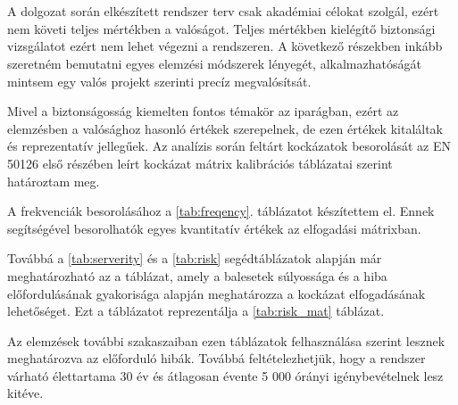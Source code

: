 \chapter{\analysis}\label{chap:analysis}
A dolgozat során elkészített rendszer terv csak akadémiai célokat szolgál, ezért nem követi teljes mértékben a valóságot.
Teljes mértékben kielégítő biztonsági vizsgálatot ezért nem lehet végezni a rendszeren.
A következő részekben inkább szeretném bemutatni egyes elemzési módszerek lényegét, alkalmazhatóságát mintsem egy valós projekt szerinti precíz megvalósítsát.

Mivel a biztonságosság kiemelten fontos témakör az iparágban, ezért az elemzésben a valósághoz hasonló értékek szerepelnek, de ezen értékek kitaláltak és reprezentatív jellegűek.
Az analízis során feltárt kockázatok besorolását az EN 50126\cite{EN50126-1} első részében leírt kockázat mátrix kalibrációs táblázatai szerint határoztam meg.

A frekvenciák besorolásához a \ref{tab:freqency}. táblázatot készítettem el.
Ennek segítségével besorolhatók egyes kvantitatív értékek az elfogadási mátrixban.

Továbbá a \ref{tab:serverity} és a \ref{tab:risk} segédtáblázatok alapján már meghatározható az a táblázat, amely a balesetek súlyossága és a hiba előfordulásának gyakorisága alapján meghatározza a kockázat elfogadásának lehetőséget.
Ezt a táblázatot reprezentálja a \ref{tab:risk_mat} táblázat.

Az elemzések további szakaszaiban ezen táblázatok felhasználása szerint lesznek meghatározva az előforduló hibák.
Továbbá feltételezhetjük, hogy a rendszer várható élettartama 30 év és átlagosan évente 5 000 órányi igénybevételnek lesz kitéve.


